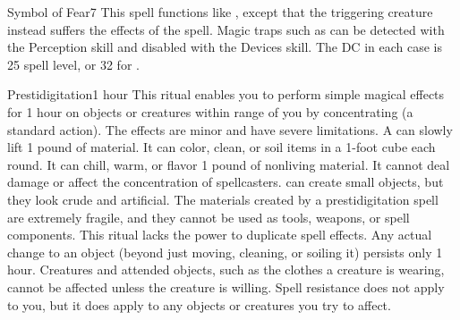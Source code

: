 \begin{spellsection}{Symbol of Fear}{7}
\spelleffect This spell functions like , except that the triggering creature instead suffers the effects of the  spell.
\spellnotes Magic traps such as  can be detected with the Perception skill and disabled with the Devices skill. The DC in each case is 25 \add spell level, or 32 for .
\end{spellsection}

\begin{spellsection}{Prestidigitation}{1}
 hour
\spelleffect This ritual enables you to perform simple magical effects for 1 hour on objects or creatures within \rngclose range of you by concentrating (a standard action). The effects are minor and have severe limitations. A  can slowly lift 1 pound of material. It can color, clean, or soil items in a 1-foot cube each round. It can chill, warm, or flavor 1 pound of nonliving material. It cannot deal damage or affect the concentration of spellcasters.  can create small objects, but they look crude and artificial. The materials created by a prestidigitation spell are extremely fragile, and they cannot be used as tools, weapons, or spell components.
\spellnotes This ritual lacks the power to duplicate spell effects. Any actual change to an object (beyond just moving, cleaning, or soiling it) persists only 1 hour. Creatures and attended objects, such as the clothes a creature is wearing, cannot be affected unless the creature is willing. Spell resistance does not apply to you, but it does apply to any objects or creatures you try to affect.
\end{spellsection}


